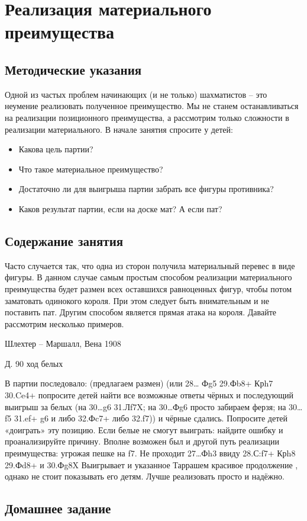\chapter{Реализация материального преимущества}

\section{Методические указания}

Одной из частых проблем начинающих (и не только) шахматистов – это неумение реализовать полученное преимущество. Мы не станем останавливаться на реализации позиционного преимущества, а рассмотрим только сложности в реализации материального. В начале занятия спросите у детей:

\begin{itemize}
\item Какова цель партии?
\item Что такое материальное преимущество?
\item Достаточно ли для выигрыша партии забрать все фигуры противника?
\item Каков результат партии, если на доске мат? А если пат?
\end{itemize}

\section{Содержание занятия}

Часто случается так, что одна из сторон получила материальный перевес в виде фигуры. В данном случае самым простым способом реализации материального преимущества будет размен всех оставшихся равноценных фигур, чтобы потом заматовать одинокого короля. При этом следует быть внимательным и не поставить пат. Другим способом является прямая атака на короля. Давайте рассмотрим несколько примеров.

Шлехтер – Маршалл, Вена 1908
 
Д. 90 ход белых

В партии последовало:  (предлагаем размен)  (или 28… Фg5 29.Фb8+ Крh7 30.Ce4+ попросите детей найти все возможные ответы чёрных и последующий выигрыш за белых (на 30…g6 31.Лf7X; на 30…Фg6 просто забираем ферзя; на 30…f5 31.ef+ g6 и либо 32.Фc7+ либо 32.f7))  и чёрные сдались. Попросите детей «доиграть» эту позицию. Если белые не смогут выиграть: найдите ошибку и проанализируйте причину. 
Вполне возможен был и другой путь реализации преимущества:  угрожая пешке на f7. Не проходит 27…Фh3 ввиду 28.С:f7+ Крh8 29.Фd8+ и 30.Фg8X
Выигрывает и указанное Таррашем красивое продолжение , однако не стоит показывать его детям. Лучше реализовать просто и надёжно.

\section{Домашнее задание}


